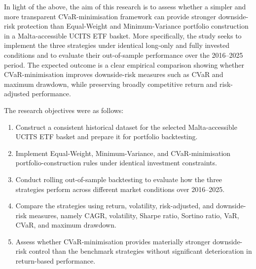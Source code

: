 \par In light of the above, the aim of this research is to assess whether a simpler and more transparent CVaR-minimisation framework can provide stronger downside-risk protection than Equal-Weight and Minimum-Variance portfolio construction in a Malta-accessible UCITS ETF basket. More specifically, the study seeks to implement the three strategies under identical long-only and fully invested conditions and to evaluate their out-of-sample performance over the 2016–2025 period. The expected outcome is a clear empirical comparison showing whether CVaR-minimisation improves downside-risk measures such as CVaR and maximum drawdown, while preserving broadly competitive return and risk-adjusted performance. 
\par The research objectives were as follows:
\begin{enumerate}
    \item Construct a consistent historical dataset for the selected Malta-accessible UCITS ETF basket and prepare it for portfolio backtesting. 
    \item Implement Equal-Weight, Minimum-Variance, and CVaR-minimisation portfolio-construction rules under identical investment constraints. 
    \item Conduct rolling out-of-sample backtesting to evaluate how the three strategies perform across different market conditions over 2016–2025.
    \item Compare the strategies using return, volatility, risk-adjusted, and downside-risk measures, namely CAGR, volatility, Sharpe ratio, Sortino ratio, VaR, CVaR, and maximum drawdown.
    \item Assess whether CVaR-minimisation provides materially stronger downside-risk control than the benchmark strategies without significant deterioration in return-based performance.
\end{enumerate}

